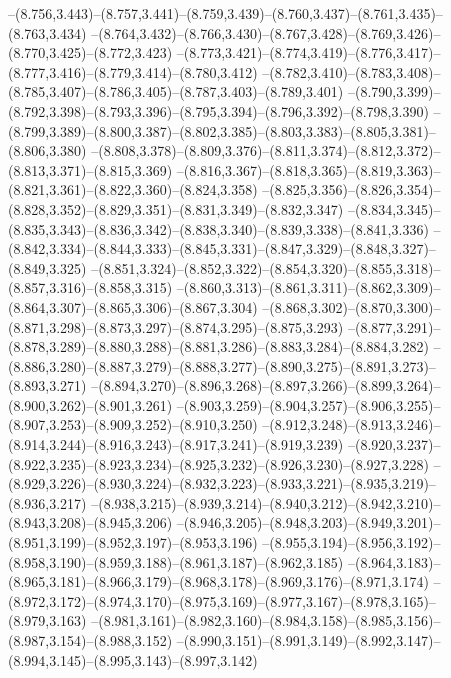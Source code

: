   --(8.756,3.443)--(8.757,3.441)--(8.759,3.439)--(8.760,3.437)--(8.761,3.435)--(8.763,3.434)%
  --(8.764,3.432)--(8.766,3.430)--(8.767,3.428)--(8.769,3.426)--(8.770,3.425)--(8.772,3.423)%
  --(8.773,3.421)--(8.774,3.419)--(8.776,3.417)--(8.777,3.416)--(8.779,3.414)--(8.780,3.412)%
  --(8.782,3.410)--(8.783,3.408)--(8.785,3.407)--(8.786,3.405)--(8.787,3.403)--(8.789,3.401)%
  --(8.790,3.399)--(8.792,3.398)--(8.793,3.396)--(8.795,3.394)--(8.796,3.392)--(8.798,3.390)%
  --(8.799,3.389)--(8.800,3.387)--(8.802,3.385)--(8.803,3.383)--(8.805,3.381)--(8.806,3.380)%
  --(8.808,3.378)--(8.809,3.376)--(8.811,3.374)--(8.812,3.372)--(8.813,3.371)--(8.815,3.369)%
  --(8.816,3.367)--(8.818,3.365)--(8.819,3.363)--(8.821,3.361)--(8.822,3.360)--(8.824,3.358)%
  --(8.825,3.356)--(8.826,3.354)--(8.828,3.352)--(8.829,3.351)--(8.831,3.349)--(8.832,3.347)%
  --(8.834,3.345)--(8.835,3.343)--(8.836,3.342)--(8.838,3.340)--(8.839,3.338)--(8.841,3.336)%
  --(8.842,3.334)--(8.844,3.333)--(8.845,3.331)--(8.847,3.329)--(8.848,3.327)--(8.849,3.325)%
  --(8.851,3.324)--(8.852,3.322)--(8.854,3.320)--(8.855,3.318)--(8.857,3.316)--(8.858,3.315)%
  --(8.860,3.313)--(8.861,3.311)--(8.862,3.309)--(8.864,3.307)--(8.865,3.306)--(8.867,3.304)%
  --(8.868,3.302)--(8.870,3.300)--(8.871,3.298)--(8.873,3.297)--(8.874,3.295)--(8.875,3.293)%
  --(8.877,3.291)--(8.878,3.289)--(8.880,3.288)--(8.881,3.286)--(8.883,3.284)--(8.884,3.282)%
  --(8.886,3.280)--(8.887,3.279)--(8.888,3.277)--(8.890,3.275)--(8.891,3.273)--(8.893,3.271)%
  --(8.894,3.270)--(8.896,3.268)--(8.897,3.266)--(8.899,3.264)--(8.900,3.262)--(8.901,3.261)%
  --(8.903,3.259)--(8.904,3.257)--(8.906,3.255)--(8.907,3.253)--(8.909,3.252)--(8.910,3.250)%
  --(8.912,3.248)--(8.913,3.246)--(8.914,3.244)--(8.916,3.243)--(8.917,3.241)--(8.919,3.239)%
  --(8.920,3.237)--(8.922,3.235)--(8.923,3.234)--(8.925,3.232)--(8.926,3.230)--(8.927,3.228)%
  --(8.929,3.226)--(8.930,3.224)--(8.932,3.223)--(8.933,3.221)--(8.935,3.219)--(8.936,3.217)%
  --(8.938,3.215)--(8.939,3.214)--(8.940,3.212)--(8.942,3.210)--(8.943,3.208)--(8.945,3.206)%
  --(8.946,3.205)--(8.948,3.203)--(8.949,3.201)--(8.951,3.199)--(8.952,3.197)--(8.953,3.196)%
  --(8.955,3.194)--(8.956,3.192)--(8.958,3.190)--(8.959,3.188)--(8.961,3.187)--(8.962,3.185)%
  --(8.964,3.183)--(8.965,3.181)--(8.966,3.179)--(8.968,3.178)--(8.969,3.176)--(8.971,3.174)%
  --(8.972,3.172)--(8.974,3.170)--(8.975,3.169)--(8.977,3.167)--(8.978,3.165)--(8.979,3.163)%
  --(8.981,3.161)--(8.982,3.160)--(8.984,3.158)--(8.985,3.156)--(8.987,3.154)--(8.988,3.152)%
  --(8.990,3.151)--(8.991,3.149)--(8.992,3.147)--(8.994,3.145)--(8.995,3.143)--(8.997,3.142)%
